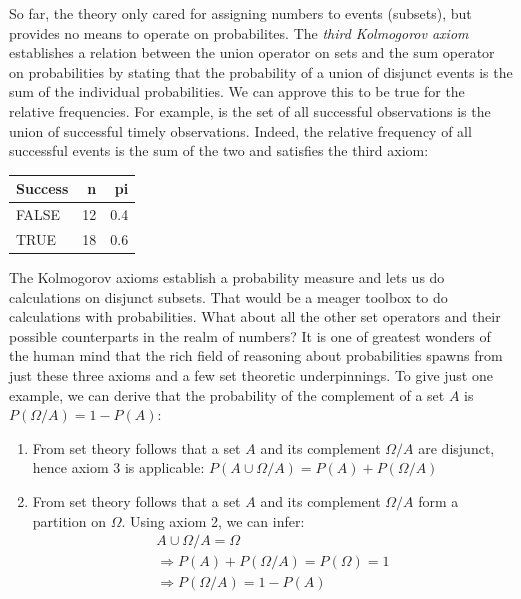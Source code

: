 \documentclass[]{svmono}
\newenvironment{Shaded}{\begin{snugshade}}{\end{snugshade}}
\newcommand{\KeywordTok}[1]{\textcolor[rgb]{0.13,0.29,0.53}{\textbf{#1}}}
\newcommand{\DataTypeTok}[1]{\textcolor[rgb]{0.13,0.29,0.53}{#1}}
\newcommand{\StringTok}[1]{\textcolor[rgb]{0.31,0.60,0.02}{#1}}
\newcommand{\OperatorTok}[1]{\textcolor[rgb]{0.81,0.36,0.00}{\textbf{#1}}}
\newcommand{\NormalTok}[1]{#1}
\theoremstyle{definition}
\theoremstyle{definition}
\theoremstyle{definition}
\theoremstyle{remark}
\begin{document}
So far, the theory only cared for assigning numbers to events (subsets),
but provides no means to operate on probabilites. The \emph{third
Kolmogorov axiom} establishes a relation between the union operator on
sets and the sum operator on probabilities by stating that the
probability of a union of disjunct events is the sum of the individual
probabilities. We can approve this to be true for the relative
frequencies. For example, is the set of all successful observations is
the union of successful timely observations. Indeed, the relative
frequency of all successful events is the sum of the two and satisfies
the third axiom:

\begin{Shaded}
\end{Shaded}

\begin{tabular}{l|r|r}
\hline
Success & n & pi\\
\hline
FALSE & 12 & 0.4\\
\hline
TRUE & 18 & 0.6\\
\hline
\end{tabular}

The Kolmogorov axioms establish a probability measure and lets us do
calculations on disjunct subsets. That would be a meager toolbox to do
calculations with probabilities. What about all the other set operators
and their possible counterparts in the realm of numbers? It is one of
greatest wonders of the human mind that the rich field of reasoning
about probabilities spawns from just these three axioms and a few set
theoretic underpinnings. To give just one example, we can derive that
the probability of the complement of a set \(A\) is
\(P(\Omega/A) = 1 - P(A)\):

\begin{enumerate}
\def\labelenumi{\arabic{enumi}.}
\item
  From set theory follows that a set \(A\) and its complement
  \(\Omega/A\) are disjunct, hence axiom 3 is applicable:
  \(P(A \cup \Omega/A) = P(A) + P(\Omega/A)\)
\item
  From set theory follows that a set \(A\) and its complement
  \(\Omega/A\) form a partition on \(\Omega\). Using axiom 2, we can
  infer: \[\begin{aligned}
  A \cup \Omega/A = \Omega\\ 
  \Rightarrow P(A) + P(\Omega/A) = P(\Omega) = 1\\ 
  \Rightarrow P(\Omega/A) = 1 - P(A)
  \end{aligned}\]
\end{enumerate}
\end{document}
